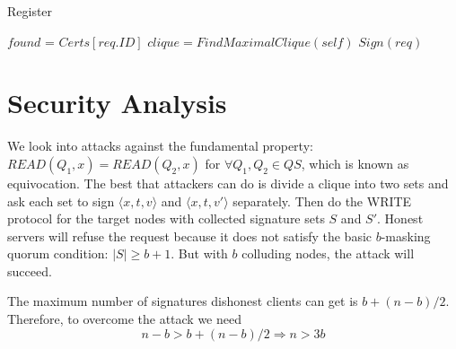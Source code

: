 \documentclass[twoside,twocolumn,10pt,fleqn]{article}
\begin{document}
\begin{algorithm}
  \caption{Register}
  \SetAlgoNoLine
  $found$ = $Certs[req.ID]$\;
  {
    $clique = FindMaximalClique(self)$\;
    {
      $Sign(req)$\;
    }
  }
\end{algorithm}

\section{Security Analysis}
We look into attacks against the fundamental property:
$READ(Q_1,x) = READ(Q_2,x)$ for $\forall Q_1, Q_2 \in QS$, which is
known as equivocation.  The best that attackers can do is divide a
clique into two sets and ask each set to sign $\langle x,t,v \rangle$
and $\langle x,t,v' \rangle$ separately. Then do the WRITE protocol
for the target nodes with collected signature sets $S$ and
$S'$. Honest servers will refuse the request because it does not
satisfy the basic $b$-masking quorum condition: $|S| \geq b+1$. But
with $b$ colluding nodes, the attack will succeed.

\newcommand{\slice}[4]{
  \pgfmathparse{0.5*#1+0.5*#2}
  \let\midangle\pgfmathresult

  \draw[thick,fill=black!10] (0,0) -- (#1:1) arc (#1:#2:1) -- cycle;

  \node[label=\midangle:#4] at (\midangle:1) {};

  \pgfmathparse{min((#2-#1-10)/110*(-0.3),0)}
  \let\temp\pgfmathresult
  \pgfmathparse{max(\temp,-0.5) + 0.8}
  \let\innerpos\pgfmathresult
  \node at (\midangle:\innerpos) {#3};
}


The maximum number of signatures dishonest clients can get is
$b+(n-b)/2$. Therefore, to overcome the attack we need
\[ n-b > b+(n-b)/2 \Rightarrow n > 3b \]
\end{document}
